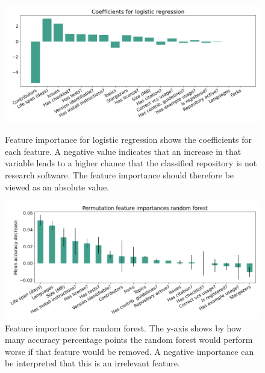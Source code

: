 \begin{figure}[h!]
\centerline{
\includegraphics[scale=0.5]{figures_results/stats_feature_importance_logit.png}}
\caption{Feature importance for logistic regression shows the coefficients for each feature. A negative value indicates that an increase in that variable leads to a higher chance that the classified repository is not research software. The feature importance should therefore be viewed as an absolute value.
\label{fig:stats_feature_importance_logit}}
\centerline{
\includegraphics[scale=0.5]{figures_results/stats_feature_importance_forest.png}}
\caption{Feature importance for random forest. The y-axis shows by how many accuracy percentage points the random forest would perform worse if that feature would be removed. A negative importance can be interpreted that this is an irrelevant feature.
\label{fig:stats_feature_importance_rf}}
\end{figure}